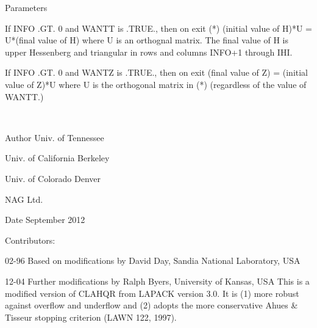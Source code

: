 \begin{DoxyParams}[1]{Parameters}
\begin{DoxyVerb}
                  If INFO .GT. 0 and WANTT is .TRUE., then on exit
          (*)       (initial value of H)*U  = U*(final value of H)
                  where U is an orthognal matrix.    The final
                  value of H is upper Hessenberg and triangular in
                  rows and columns INFO+1 through IHI.

                  If INFO .GT. 0 and WANTZ is .TRUE., then on exit
                      (final value of Z)  = (initial value of Z)*U
                  where U is the orthogonal matrix in (*)
                  (regardless of the value of WANTT.)\end{DoxyVerb}
 \\
\hline
\end{DoxyParams}
\begin{DoxyAuthor}{Author}
Univ. of Tennessee 

Univ. of California Berkeley 

Univ. of Colorado Denver 

N\+A\+G Ltd. 
\end{DoxyAuthor}
\begin{DoxyDate}{Date}
September 2012 
\end{DoxyDate}
\begin{DoxyParagraph}{Contributors\+: }
\begin{DoxyVerb}     02-96 Based on modifications by
     David Day, Sandia National Laboratory, USA

     12-04 Further modifications by
     Ralph Byers, University of Kansas, USA
     This is a modified version of CLAHQR from LAPACK version 3.0.
     It is (1) more robust against overflow and underflow and
     (2) adopts the more conservative Ahues & Tisseur stopping
     criterion (LAWN 122, 1997).\end{DoxyVerb}
 
\end{DoxyParagraph}
